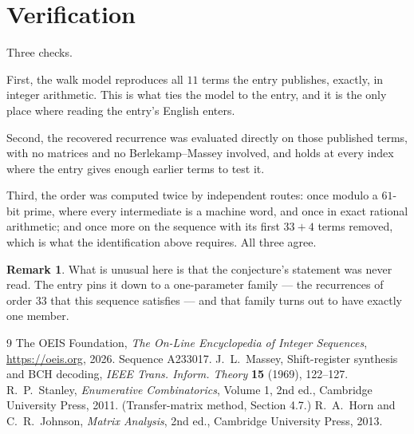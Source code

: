 \documentclass[11pt,a4paper]{article}
\theoremstyle{plain}
\theoremstyle{definition}
\newtheorem{remark}[theorem]{Remark}
\begin{document}
\section{Verification}

Three checks.

First, the walk model reproduces all $11$ terms the entry publishes, exactly, in integer
arithmetic. This is what ties the model to the entry, and it is the only place where reading
the entry's English enters.

Second, the recovered recurrence was evaluated directly on those published terms, with no
matrices and no Berlekamp--Massey involved, and holds at every index where the entry gives
enough earlier terms to test it.

Third, the order was computed twice by independent routes: once modulo a $61$-bit prime, where
every intermediate is a machine word, and once in exact rational arithmetic; and once more on
the sequence with its first $33+4$ terms removed, which is what the identification above
requires. All three agree.

\begin{remark}
What is unusual here is that the conjecture's statement was never read. The entry pins it down
to a one-parameter family --- the recurrences of order $33$ that this sequence satisfies
--- and that family turns out to have exactly one member.
\end{remark}

\begin{thebibliography}{9}
 The OEIS Foundation, \emph{The On-Line Encyclopedia of Integer
Sequences}, \url{https://oeis.org}, 2026. Sequence A233017.
 J.~L.~Massey, Shift-register synthesis and BCH decoding, \emph{IEEE
Trans. Inform. Theory} \textbf{15} (1969), 122--127.
 R.~P.~Stanley, \emph{Enumerative Combinatorics}, Volume 1, 2nd ed.,
Cambridge University Press, 2011. (Transfer-matrix method, Section 4.7.)
 R.~A.~Horn and C.~R.~Johnson, \emph{Matrix Analysis}, 2nd ed., Cambridge
University Press, 2013.
\end{thebibliography}
\end{document}
